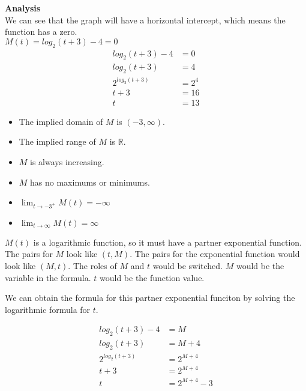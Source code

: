 \documentclass{ximera}
\begin{document}
\begin{example}
\textbf{\textcolor{red!25!blue!75!}{Analysis}} \\


We can see that the graph will have a horizontal intercept, which means the function has a zero. \\


$M(t) = log_2(t+3) - 4 = 0$ \\


\begin{align*}
log_2(t+3) - 4 & = 0 \\
log_2(t+3) & = 4 \\
2^{log_2(t+3)} & = 2^4 \\
t+3 & = 16 \\
t & = 13
\end{align*}









\begin{itemize}
\item The implied domain of $M$ is $(-3,\infty)$.
\item The implied range of $M$ is $\mathbb{R}$.
\item $M$ is always increasing.
\item $M$ has no maximums or minimums.
\item $\lim_{t \to -3^+} M(t) = -\infty$
\item $\lim_{t \to \infty} M(t) = \infty$
\end{itemize}





\end{example}



$M(t)$ is a logarithmic function, so it must have a partner exponential function.  The pairs for $M$ look like $(t, M)$. The pairs for the exponential function would look like $(M, t)$.  The roles of $M$ and $t$ would be switched. $M$ would be the variable in the formula. $t$ would be the function value.


We can obtain the formula for this partner exponential funciton by solving the logarithmic formula for $t$.





\begin{align*}
log_2(t+3) - 4 & = M \\
log_2(t+3) & = M + 4 \\
2^{log_2(t+3)} & = 2^{M+4} \\
t+3 & = 2^{M+4} \\
t & = 2^{M+4} - 3
\end{align*}
\end{document}
